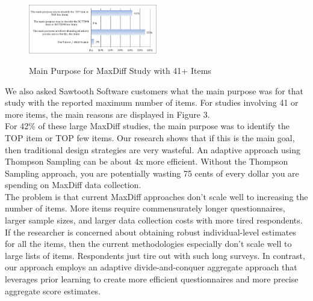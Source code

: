\documentclass[nonblindrev]{informs3}
\begin{document}
\begin{figure}
\caption{Main Purpose for MaxDiff Study with 41+ Items}
\includegraphics[width=0.5\textwidth]{plots/maxdiffpurpose}
\label{fig:purpose}
\end{figure}
We also asked Sawtooth Software customers what the main purpose was for that study with the reported maximum number of items.  For studies involving 41 or more items, the main reasons are displayed in Figure 3.\\
For 42\% of these large MaxDiff studies, the main purpose was to identify the TOP item or TOP few items.  Our research shows that if this is the main goal, then traditional design strategies are very wasteful.  An adaptive approach using Thompson Sampling can be about 4x more efficient.  Without the Thompson Sampling approach, you are potentially wasting 75 cents of every dollar you are spending on MaxDiff data collection. \\
The problem is that current MaxDiff approaches don't scale well to increasing the number of items.  More items require commensurately longer questionnaires, larger sample sizes, and larger data collection costs with more tired respondents.  If the researcher is concerned about obtaining robust individual-level estimates for all the items, then the current methodologies especially don't scale well to large lists of items.  Respondents just tire out with such long surveys.  In contrast, our approach employs an adaptive divide-and-conquer aggregate approach that leverages prior learning to create more efficient questionnaires and more precise aggregate score estimates. \\
\end{document}
